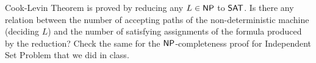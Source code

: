 \documentclass[12pt]{exam}
\begin{document}
\begin{questions}
\begin{solution}
  
\end{solution}


\question
Cook-Levin Theorem is proved by reducing any $L \in {\ensuremath{\mathsf{NP}}}$ to ${\mathsf{SAT}}$. Is there any relation between the number of accepting paths of the non-deterministic machine (deciding $L$) and the number of satisfying assignments of the formula produced by the reduction? Check the same for the ${\mathsf{NP}}$-completeness proof for {\sc Independent Set Problem} that we did in class.

\end{questions}

%
\end{document}
